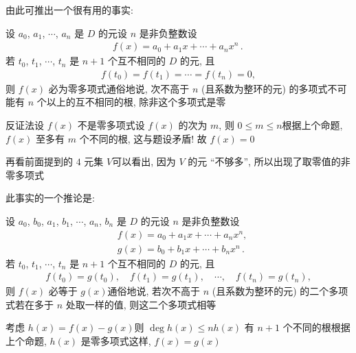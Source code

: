 由此可推出一个很有用的事实:

\begin{proposition}
    设 $a_0$, $a_1$, $\cdots$, $a_n$ 是 $D$ 的元\period 设 $n$ 是非负整数\period 设
    \begin{align*}
        f(x) = a_0 + a_1 x + \cdots + a_n x^n \period
    \end{align*}
    若 $t_0$, $t_1$, $\cdots$, $t_n$ 是 $n+1$ 个互不相同的 $D$ 的元, 且
    \begin{align*}
        f(t_0) = f(t_1) = \cdots = f(t_n) = 0,
    \end{align*}
    则 $f(x)$ 必为零多项式\period 通俗地说, 次不高于 $n$ (且系数为整环的元) 的多项式不可能有 $n$ 个以上的互不相同的根, 除非这个多项式是零\period
\end{proposition}

\begin{pf}
    反证法\period 设 $f(x)$ 不是零多项式\period 设 $f(x)$ 的次为 $m$, 则 $0 \leq m \leq n$\period 根据上个命题, $f(x)$ 至多有 $m$ 个不同的根, 这与题设矛盾! 故 $f(x) = 0$\period
\end{pf}

\begin{remark}
    再看前面提到的 $4$ 元集 $V$\period 可以看出, 因为 $V$ 的元 ``不够多'', 所以出现了取零值的非零多项式\period
\end{remark}

此事实的一个推论是:

\begin{proposition}
    设 $a_0$, $b_0$, $a_1$, $b_1$, $\cdots$, $a_n$, $b_n$ 是 $D$ 的元\period 设 $n$ 是非负整数\period 设
    \begin{align*}
         & f(x) = a_0 + a_1 x + \cdots + a_n x^n,        \\
         & g(x) = b_0 + b_1 x + \cdots + b_n x^n \period
    \end{align*}
    若 $t_0$, $t_1$, $\cdots$, $t_n$ 是 $n+1$ 个互不相同的 $D$ 的元, 且
    \begin{align*}
        f(t_0) = g(t_0), \quad f(t_1) = g(t_1), \quad \cdots, \quad f(t_n) = g(t_n),
    \end{align*}
    则 $f(x)$ 必等于 $g(x)$\period 通俗地说, 若次不高于 $n$ (且系数为整环的元) 的二个多项式若在多于 $n$ 处取一样的值, 则这二个多项式相等\period
\end{proposition}

\begin{pf}
    考虑 $h(x) = f(x) - g(x)$\period 则 $\deg h(x) \leq n$\period $h(x)$ 有 $n+1$ 个不同的根\period 根据上个命题, $h(x)$ 是零多项式\period 这样, $f(x) = g(x)$\period
\end{pf}

